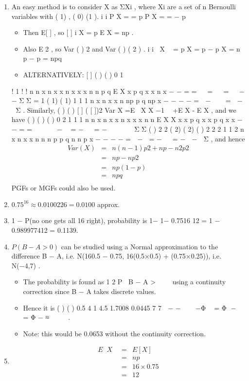 \documentclass[a4paper,12pt]{article}
\begin{document}
\begin{enumerate}
\item An easy method is to consider X as ΣXi , where Xi are a set of n Bernoulli variables
with ( 1) , ( 0) (1 ). i i P X = = p P X = = − p
\begin{itemize}
\item Then E[ ] , so [ ] i X = p E X = np .
\item Also E 2 , so Var ( ) 2 and Var ( ) ( 2 ) . i i X  = p X = p − p X = n p − p = npq
\item ALTERNATIVELY: [ ] ( ) ( ) 0 1

\end{itemize}
!
1 ! !
n n x n x
x n x
x x
n n p q E X x p q
x x n x
−
−
= =
 
=   =   − −
Σ Σ
= 1 ( 1) ( 1)
1
1
1
n
x n x
x
n
np p q np
x
− − − −
=
 − 
  =  − 
Σ .
Similarly, ( ) ( ) [ ] ( [ ])2 Var X =E X X −1  +E X - E X , and we have
( ) ( ) ( )
0 2
1 1 1
n n
x n x x n x
x x
n n
E X X x x p q x x p q
x x
− −
= =
   
 −  = −   = −  
   
Σ Σ
( ) 2 2 ( 2) ( 2) ( ) 2
2
2
1 1
2
n
x n x
x
n
n n p p q n n p
x
− − − −
=
 − 
= −   = −  − 
Σ ,
and hence 
\begin{eqnarray*}
Var (X) &=& n(n −1) p2 + np − n2 p2 \\
&=& np − np2\\ 
&=& np(1-p) \\
&=& npq \\
\end{eqnarray*}
PGFs or MGFs could also be used.
\item  $0.75^{16} \approx 0.0100226 = 0.0100$ approx.
\item 1 − P(no one gets all 16 right), probability is { }1− 1− 0.7516 12
= 1 − {0.9899774}12 = 0.1139.
\item $P(B − A > 0)$ can be studied using a Normal approximation to the difference
B − A, i.e. N(16{0.5 − 0.75}, 16{(0.5×0.5) + (0.75×0.25)}), i.e. N(−4,7) .
\begin{itemize}
    \item The probability is found as 1
2
P B − A > 
 
using a continuity correction since B − A
takes discrete values.
\item Hence it is ( ) ( ) 0.5 4 1 4.5 1.7008 0.0445
7 7
 − −    −Φ  = Φ −  = Φ − ≈
   
.
\item Note: this would be 0.0653 without the continuity correction.
\end{itemize}

\item 
\begin{eqnarray*}
E X  &=& E[X ] \\
&=& np \\
&=& 16\times 0.75 \\
&=& 12 
\end{eqnarray*}


\end{enumerate}
\end{document}
